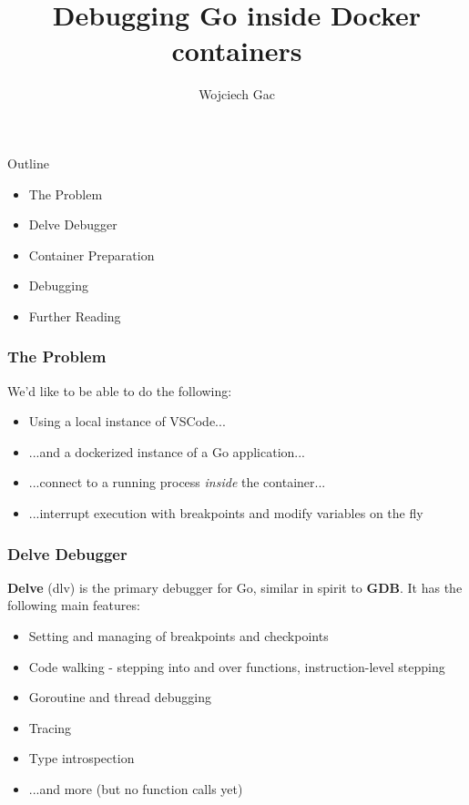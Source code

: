 \documentclass[pdf,xcolor=dvipsnames]{beamer}
\title{Debugging Go inside Docker containers}
\author{Wojciech Gac}
\begin{document}
\begin{frame}
  \titlepage
\end{frame}

\begin{frame}{Outline}
  \pause
  \begin{itemize}
  \item The Problem
    \pause
  \item Delve Debugger
    \pause
  \item Container Preparation
    \pause
  \item Debugging
    \pause
  \item Further Reading
  \end{itemize}
\end{frame}

\begin{frame}
  \frametitle{The Problem}
  We'd like to be able to do the following:
  \pause{}
  \begin{itemize}
  \item Using a local instance of VSCode...
    \pause{}
  \item ...and a dockerized instance of a Go application...
    \pause{}
  \item ...connect to a running process \emph{inside} the container...
    \pause{}
  \item ...interrupt execution with breakpoints and modify variables on the fly
  \end{itemize}
  
\end{frame}

\begin{frame}
  \frametitle{Delve Debugger}
  \textbf{Delve} (dlv) is the primary debugger for Go, similar in
  spirit to \textbf{GDB}. It has the following main features:
  \pause{}
  \begin{itemize}
  \item Setting and managing of breakpoints and checkpoints
    \pause{}
  \item Code walking - stepping into and over functions, instruction-level stepping
    \pause{}
  \item Goroutine and thread debugging
    \pause{}
  \item Tracing
    \pause{}
  \item Type introspection
    \pause{}
  \item ...and more (but no function calls yet)
  \end{itemize}
  
\end{frame}
\end{document}
